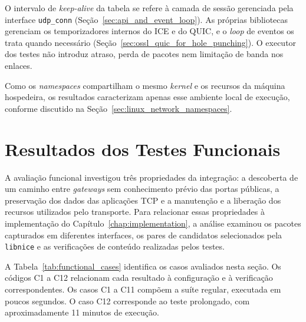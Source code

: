 O intervalo de \textit{keep-alive} da tabela se refere à camada de sessão gerenciada pela interface \texttt{udp\_conn} (Seção~\ref{sec:api_and_event_loop}). As próprias bibliotecas gerenciam os temporizadores internos do ICE e do QUIC, e o \textit{loop} de eventos os trata quando necessário (Seção~\ref{sec:ossl_quic_for_hole_punching}). O executor dos testes não introduz atraso, perda de pacotes nem limitação de banda nos enlaces.

Como os \textit{namespaces} compartilham o mesmo \textit{kernel} e os recursos da máquina hospedeira, os resultados caracterizam apenas esse ambiente local de execução, conforme discutido na Seção~\ref{sec:linux_network_namespaces}.

\section{Resultados dos Testes Funcionais}
\label{sec:functional_results}

A avaliação funcional investigou três propriedades da integração: a descoberta de um caminho entre \textit{gateways} sem conhecimento prévio das portas públicas, a preservação dos dados das aplicações TCP e a manutenção e a liberação dos recursos utilizados pelo transporte. Para relacionar essas propriedades à implementação do Capítulo~\ref{chap:implementation}, a análise examinou os pacotes capturados em diferentes interfaces, os pares de candidatos selecionados pela \texttt{libnice} e as verificações de conteúdo realizadas pelos testes.

A Tabela~\ref{tab:functional_cases} identifica os casos avaliados nesta seção. Os códigos C1 a C12 relacionam cada resultado à configuração e à verificação correspondentes. Os casos C1 a C11 compõem a suíte regular, executada em poucos segundos. O caso C12 corresponde ao teste prolongado, com aproximadamente 11 minutos de execução.


